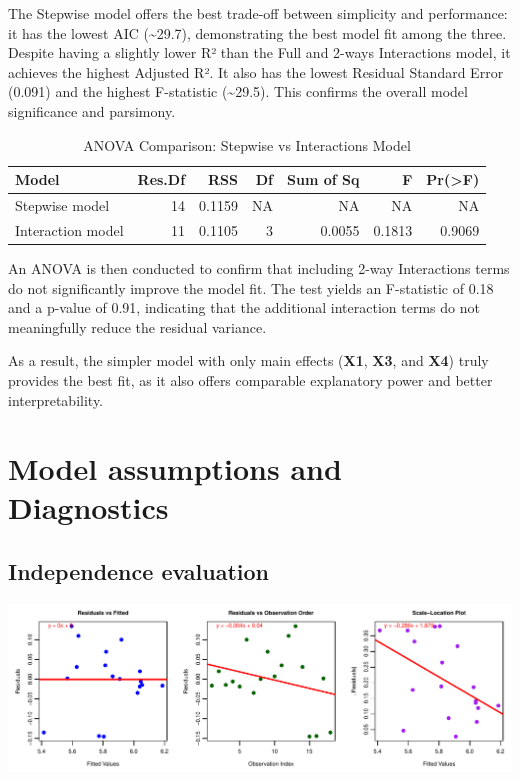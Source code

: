 \documentclass[
  11pt,
]{article}
\begin{document}
The Stepwise model offers the best trade-off between simplicity and
performance: it has the lowest AIC (\textasciitilde29.7), demonstrating
the best model fit among the three. Despite having a slightly lower R²
than the Full and 2-ways Interactions model, it achieves the highest
Adjusted R². It also has the lowest Residual Standard Error (0.091) and
the highest F-statistic (\textasciitilde29.5). This confirms the overall
model significance and parsimony.

\begin{table}[!h]
\centering
\caption{\label{tab:unnamed-chunk-12}ANOVA Comparison: Stepwise vs Interactions Model}
\centering
\fontsize{8}{10}\selectfont
\begin{tabular}[t]{lrrrrrr}
\toprule
Model & Res.Df & RSS & Df & Sum of Sq & F & Pr(>F)\\
\midrule
Stepwise model & 14 & 0.1159 & NA & NA & NA & NA\\
Interaction model & 11 & 0.1105 & 3 & 0.0055 & 0.1813 & 0.9069\\
\bottomrule
\end{tabular}
\end{table}

An ANOVA is then conducted to confirm that including 2-way Interactions
terms do not significantly improve the model fit. The test yields an
F-statistic of 0.18 and a p-value of 0.91, indicating that the
additional interaction terms do not meaningfully reduce the residual
variance.

As a result, the simpler model with only main effects (\textbf{X1},
\textbf{X3}, and \textbf{X4}) truly provides the best fit, as it also
offers comparable explanatory power and better interpretability.

\section{Model assumptions and
Diagnostics}\label{model-assumptions-and-diagnostics}

\subsection{Independence evaluation}\label{independence-evaluation}

\includegraphics{Figs/unnamed-chunk-13-1.pdf}
\end{document}
